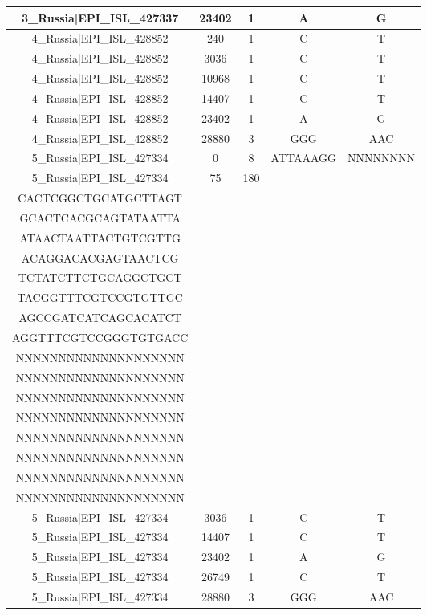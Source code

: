 \documentclass[a4paper,10pt]{article}
\begin{document}
\begin{longtable}{@{}ccccc@{}}
3\_Russia|EPI\_ISL\_427337 & 23402 & 1 & A & G \\* \midrule
4\_Russia|EPI\_ISL\_428852 & 240 & 1 & C & T \\* \midrule
4\_Russia|EPI\_ISL\_428852 & 3036 & 1 & C & T \\* \midrule
4\_Russia|EPI\_ISL\_428852 & 10968 & 1 & C & T \\* \midrule
4\_Russia|EPI\_ISL\_428852 & 14407 & 1 & C & T \\* \midrule
4\_Russia|EPI\_ISL\_428852 & 23402 & 1 & A & G \\* \midrule
4\_Russia|EPI\_ISL\_428852 & 28880 & 3 & GGG & AAC \\* \midrule
5\_Russia|EPI\_ISL\_427334 & 0 & 8 & ATTAAAGG & NNNNNNNN \\* \midrule
5\_Russia|EPI\_ISL\_427334 & 75 & 180 & \begin{tabular}[c]{@{}c@{}}TTTAAAATCTGTGTGGCTGT\\ CACTCGGCTGCATGCTTAGT\\ GCACTCACGCAGTATAATTA\\ ATAACTAATTACTGTCGTTG\\ ACAGGACACGAGTAACTCG\\ TCTATCTTCTGCAGGCTGCT\\ TACGGTTTCGTCCGTGTTGC\\ AGCCGATCATCAGCACATCT\\ AGGTTTCGTCCGGGTGTGACC\end{tabular} & \begin{tabular}[c]{@{}c@{}}NNNNNNNNNNNNNNNNNNNN\\ NNNNNNNNNNNNNNNNNNNN\\ NNNNNNNNNNNNNNNNNNNN\\ NNNNNNNNNNNNNNNNNNNN\\ NNNNNNNNNNNNNNNNNNNN\\ NNNNNNNNNNNNNNNNNNNN\\ NNNNNNNNNNNNNNNNNNNN\\ NNNNNNNNNNNNNNNNNNNN\\ NNNNNNNNNNNNNNNNNNNN\end{tabular} \\* \midrule
5\_Russia|EPI\_ISL\_427334 & 3036 & 1 & C & T \\* \midrule
5\_Russia|EPI\_ISL\_427334 & 14407 & 1 & C & T \\* \midrule
5\_Russia|EPI\_ISL\_427334 & 23402 & 1 & A & G \\* \midrule
5\_Russia|EPI\_ISL\_427334 & 26749 & 1 & C & T \\* \midrule
5\_Russia|EPI\_ISL\_427334 & 28880 & 3 & GGG & AAC \\* \midrule

\end{longtable}
\end{document}
